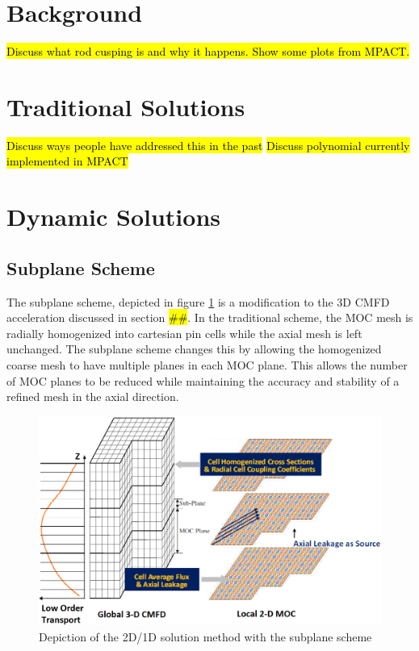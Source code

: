 \section{Background}

\hl{Discuss what rod cusping is and why it happens.  Show some plots from MPACT.}

\section{Traditional Solutions}

\hl{Discuss ways people have addressed this in the past}
\hl{Discuss polynomial currently implemented in MPACT}

\section{Dynamic Solutions}

\subsection{Subplane Scheme}

The subplane scheme, depicted in figure \ref{f:subplane} is a modification to the 3D CMFD acceleration discussed in section \hl{\#\#}.  In the traditional scheme, the MOC mesh is radially homogenized into cartesian pin cells while the axial mesh is left unchanged.  The subplane scheme changes this by allowing the homogenized coarse mesh to have multiple planes in each MOC plane.  This allows the number of MOC planes to be reduced while maintaining the accuracy and stability of a refined mesh in the axial direction.

\begin{figure}
\includegraphics[width=6in]{figs/2d1d-subplane.png}
\caption{Depiction of the 2D/1D solution method with the subplane scheme}\label{f:subplane}
\end{figure}


